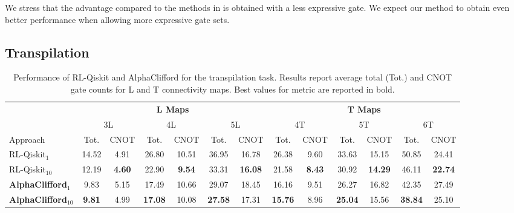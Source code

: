 \documentclass[conference]{IEEEtran}
\begin{document}
We stress that the advantage compared to the methods in \cite{webster} is obtained with a less expressive gate. We expect our method to obtain even better performance when allowing more expressive gate sets.



\subsection{Transpilation}
\label{sub:exp:trans}

\begin{table}[htb]
    \centering
    \small 
    \begin{tabular}{l cccccc cccccc}
        \toprule
        & \multicolumn{6}{c}{\textbf{L Maps}} & \multicolumn{6}{c}{\textbf{T Maps}} \\
        \cmidrule(lr){2-7} \cmidrule(lr){8-13}
        
        & \multicolumn{2}{c}{3L} & \multicolumn{2}{c}{4L} & \multicolumn{2}{c}{5L} & \multicolumn{2}{c}{4T} & \multicolumn{2}{c}{5T} & \multicolumn{2}{c}{6T} \\
        \cmidrule(lr){2-3} \cmidrule(lr){4-5} \cmidrule(lr){6-7} \cmidrule(lr){8-9} \cmidrule(lr){10-11} \cmidrule(lr){12-13}
        
        Approach & Tot. & CNOT & Tot. & CNOT & Tot. & CNOT & Tot. & CNOT & Tot. & CNOT & Tot. & CNOT \\
        \midrule
        RL-Qiskit$_{1}$ & 14.52 & 4.91 & 26.80 & 10.51 & 36.95  & 16.78 & 26.38 & 9.60 & 33.63 & 15.15 & 50.85 & 24.41 \\
        RL-Qiskit$_{10}$ & 12.19 &\textbf{4.60} & 22.90 & \textbf{9.54}  & 33.31 & \textbf{16.08} & 21.58 & \textbf{8.43} & 30.92 & \textbf{14.29} & 46.11 & \textbf{22.74} \\
        \addlinespace

        \textbf{AlphaClifford$_{1}$} & 9.83 & 5.15 & 17.49 & 10.66 & 29.07 & 18.45 & 16.16 & 9.51 & 26.27 & 16.82 & 42.35 & 27.49 \\
        \textbf{AlphaClifford$_{10}$} & \textbf{9.81} & 4.99 & \textbf{17.08} & 10.08 & \textbf{27.58} & 17.31 & \textbf{15.76} & 8.96 & \textbf{25.04} & 15.56 & \textbf{38.84} & 25.10 \\
        \bottomrule
    \end{tabular}
    \caption{Performance of RL-Qiskit \cite{qiskit_ai_transpiler_cliffords} and AlphaClifford for the transpilation task. Results report average total (Tot.) and CNOT gate counts for L and T connectivity maps. Best values for metric are reported in bold.}
    \label{tab:LT_topology_combined}
\end{table}
\end{document}
